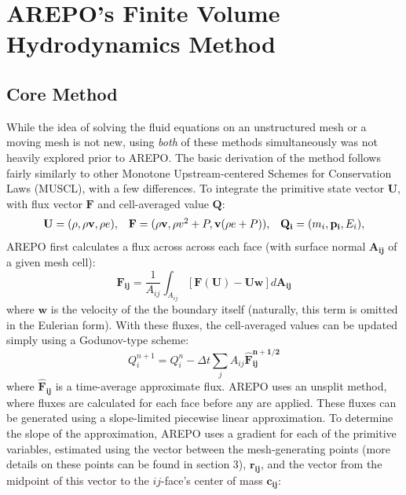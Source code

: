 \documentclass[12pt, preprint]{aastex}
\begin{document}
\section{AREPO's Finite Volume Hydrodynamics Method} 
\subsection{Core Method}
While the idea of solving the fluid equations on an unstructured mesh
\citep{xu1997} or a moving mesh \citep{gnedin1995} is not new, using
\textit{both} of these methods simultaneously was not heavily explored prior to
AREPO.  The basic derivation of the method follows fairly similarly to 
other Monotone Upstream-centered Schemes for Conservation Laws (MUSCL), with a
few differences.  To integrate the primitive state vector $\mathbf{U}$, with
flux vector $\mathbf{F}$ and cell-averaged value $\mathbf{Q}$:
\begin{equation}
	\begin{array}{l l l}
		\mathbf{U} = (\rho, \rho\mathbf{v}, \rho e),  &
		\mathbf{F} = (\rho\mathbf{v}, \rho v^2+P, \mathbf{v}(\rho e+P)), &
	\mathbf{Q_i} = (m_i, \mathbf{p_i}, E_i), \\
\end{array}
\end{equation}
AREPO first calculates a flux across across each face (with surface normal
$\mathbf{A_{ij}}$ of a given mesh cell):
\begin{equation}
	\mathbf{F_{ij}} = \frac{1}{A_{ij}}\int_{A_{ij}}
	[\mathbf{F(U)-Uw}]d\mathbf{A_{ij}}
\end{equation}
where $\mathbf{w}$ is the velocity of the the boundary itself (naturally, this
term is omitted in the Eulerian form).  With these fluxes, the cell-averaged
values can be updated simply using a Godunov-type scheme:
\begin{equation}
	Q_{i}^{n+1} = Q_i^n -\Delta t \sum_j A_{ij} \mathbf{\hat F_{ij}^{n+1/2}}
\end{equation}
where $\mathbf{\hat F_{ij}}$ is a time-average approximate flux.  AREPO uses an
unsplit method, where fluxes are calculated for each face before any are
applied.  These fluxes can be generated using a slope-limited piecewise linear
approximation.  To determine the slope of the approximation, AREPO uses a
gradient for each of the primitive variables, estimated using the vector between
the mesh-generating points (more details on these points can be found in section
3), $\mathbf{r_{ij}}$, and the vector from the midpoint of this vector to the
$ij$-face's center of mass $\mathbf{c_{ij}}$:
\end{document}
